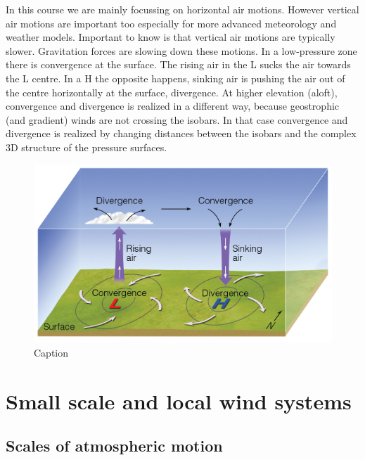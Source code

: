 \documentclass[12pt,oneside]{book}
\begin{document}
In this course we are mainly focussing on horizontal air motions.
However vertical air motions are important too especially for more
advanced meteorology and weather models. Important to know is that
vertical air motions are typically slower. Gravitation forces are
slowing down these motions. In a low-pressure zone there is convergence
at the surface. The rising air in the L sucks the air towards the L
centre. In a H the opposite happens, sinking air is pushing the air out
of the centre horizontally at the surface, divergence. At higher
elevation (aloft), convergence and divergence is realized in a different
way, because geostrophic (and gradient) winds are not crossing the
isobars. In that case convergence and divergence is realized by changing
distances between the isobars and the complex 3D structure of the
pressure surfaces.

\begin{figure}

{\centering \includegraphics[width=0.8\linewidth]{figures/Figure416} 

}

\caption{Caption}\label{fig:VAR}
\end{figure}

\section{Small scale and local wind
systems}\label{small-scale-and-local-wind-systems}

\subsection{Scales of atmospheric
motion}\label{scales-of-atmospheric-motion}
\end{document}
